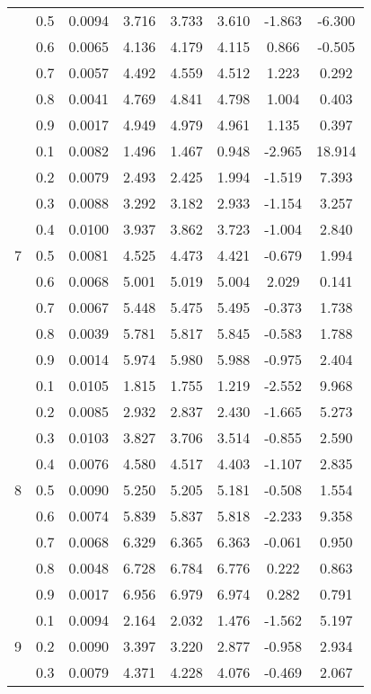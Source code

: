 \documentclass[11pt,a4paper]{report}
\begin{document}
\begin{longtable}{ | c | c || c | c | c | c | c | c | }
 & 0.5 & 0.0094 & 3.716 & 3.733 & 3.610 & -1.863 & -6.300 \\
 & 0.6 & 0.0065 & 4.136 & 4.179 & 4.115 & 0.866 & -0.505 \\
 & 0.7 & 0.0057 & 4.492 & 4.559 & 4.512 & 1.223 & 0.292 \\
 & 0.8 & 0.0041 & 4.769 & 4.841 & 4.798 & 1.004 & 0.403 \\
 & 0.9 & 0.0017 & 4.949 & 4.979 & 4.961 & 1.135 & 0.397 \\
 \hline
\multirow{9}{*}{7} & 0.1 & 0.0082 & 1.496 & 1.467 & 0.948 & -2.965 & 18.914 \\
 & 0.2 & 0.0079 & 2.493 & 2.425 & 1.994 & -1.519 & 7.393 \\
 & 0.3 & 0.0088 & 3.292 & 3.182 & 2.933 & -1.154 & 3.257 \\
 & 0.4 & 0.0100 & 3.937 & 3.862 & 3.723 & -1.004 & 2.840 \\
 & 0.5 & 0.0081 & 4.525 & 4.473 & 4.421 & -0.679 & 1.994 \\
 & 0.6 & 0.0068 & 5.001 & 5.019 & 5.004 & 2.029 & 0.141 \\
 & 0.7 & 0.0067 & 5.448 & 5.475 & 5.495 & -0.373 & 1.738 \\
 & 0.8 & 0.0039 & 5.781 & 5.817 & 5.845 & -0.583 & 1.788 \\
 & 0.9 & 0.0014 & 5.974 & 5.980 & 5.988 & -0.975 & 2.404 \\
 \hline
\multirow{9}{*}{8} & 0.1 & 0.0105 & 1.815 & 1.755 & 1.219 & -2.552 & 9.968 \\
 & 0.2 & 0.0085 & 2.932 & 2.837 & 2.430 & -1.665 & 5.273 \\
 & 0.3 & 0.0103 & 3.827 & 3.706 & 3.514 & -0.855 & 2.590 \\
 & 0.4 & 0.0076 & 4.580 & 4.517 & 4.403 & -1.107 & 2.835 \\
 & 0.5 & 0.0090 & 5.250 & 5.205 & 5.181 & -0.508 & 1.554 \\
 & 0.6 & 0.0074 & 5.839 & 5.837 & 5.818 & -2.233 & 9.358 \\
 & 0.7 & 0.0068 & 6.329 & 6.365 & 6.363 & -0.061 & 0.950 \\
 & 0.8 & 0.0048 & 6.728 & 6.784 & 6.776 & 0.222 & 0.863 \\
 & 0.9 & 0.0017 & 6.956 & 6.979 & 6.974 & 0.282 & 0.791 \\
 \hline
\multirow{9}{*}{9} & 0.1 & 0.0094 & 2.164 & 2.032 & 1.476 & -1.562 & 5.197 \\
 & 0.2 & 0.0090 & 3.397 & 3.220 & 2.877 & -0.958 & 2.934 \\
 & 0.3 & 0.0079 & 4.371 & 4.228 & 4.076 & -0.469 & 2.067 \\

\end{longtable}
\end{document}
